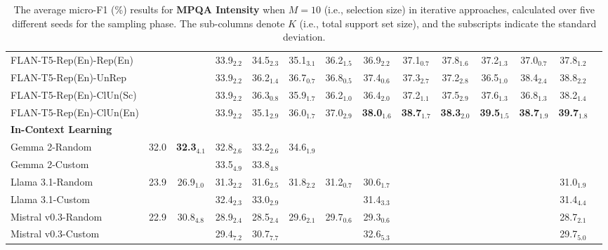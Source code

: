 \documentclass[11pt]{article}
\theoremstyle{definition}
\begin{document}
\begin{table*}[hbt]
{\begin{tabular}{l|ccccccccccccc}
FLAN-T5-Rep(En)-Rep(En) &
& & 33.9$_{2.2}$ & 34.5$_{2.3}$ & 35.1$_{3.1}$ & 36.2$_{1.5}$ & 36.9$_{2.2}$ & 37.1$_{0.7}$ & 37.8$_{1.6}$ & 37.2$_{1.3}$ & 37.0$_{0.7}$ & 37.8$_{1.2}$ & \\

FLAN-T5-Rep(En)-UnRep &
& & 33.9$_{2.2}$ & 36.2$_{1.4}$ & 36.7$_{0.7}$ & 36.8$_{0.5}$ & 37.4$_{0.6}$ & 37.3$_{2.7}$ & 37.2$_{2.8}$ & 36.5$_{1.0}$ & 38.4$_{2.4}$ & 38.8$_{2.2}$ & \\

FLAN-T5-Rep(En)-ClUn(Sc) &
& & 33.9$_{2.2}$ & 36.3$_{0.8}$ & 35.9$_{1.7}$ & 36.2$_{1.0}$ & 36.4$_{2.0}$ & 37.2$_{1.1}$ & 37.5$_{2.9}$ & 37.6$_{1.3}$ & 36.8$_{1.3}$ & 38.2$_{1.4}$ & \\

FLAN-T5-Rep(En)-ClUn(En) &
& & 33.9$_{2.2}$ & 35.1$_{2.9}$ & 36.0$_{1.7}$ & 37.0$_{2.9}$ & \textbf{38.0}$_{1.6}$ & \textbf{38.7}$_{1.7}$ & \textbf{38.3}$_{2.0}$ & \textbf{39.5}$_{1.5}$ & \textbf{38.7}$_{1.9}$ & \textbf{39.7}$_{1.8}$ & \\

\hdashline

\textbf{In-Context Learning} \\

Gemma 2-Random &
32.0 & \textbf{32.3}$_{4.1}$ & 32.8$_{2.6}$ & 33.2$_{2.6}$ & 34.6$_{1.9}$ & & & \\

Gemma 2-Custom &
& & 33.5$_{4.9}$ & 33.8$_{4.8}$ & & & \\

\hdashline[1pt/4pt]

Llama 3.1-Random &
23.9 & 26.9$_{1.0}$ & 31.3$_{2.2}$ & 31.6$_{2.5}$ & 31.8$_{2.2}$ & 31.2$_{0.7}$ & 30.6$_{1.7}$ & & & & & 31.0$_{1.9}$ \\

Llama 3.1-Custom &
& & 32.4$_{2.3}$ & 33.0$_{2.9}$ & & & 31.4$_{3.3}$ & & & & & 31.4$_{4.4}$ & \\

\hdashline[1pt/4pt]

Mistral v0.3-Random &
22.9 & 30.8$_{4.8}$ & 28.9$_{2.4}$ & 28.5$_{2.4}$ & 29.6$_{2.1}$ & 29.7$_{0.6}$ & 29.3$_{0.6}$ & & & & & 28.7$_{2.1}$ \\

Mistral v0.3-Custom &
& & 29.4$_{7.2}$ & 30.7$_{7.7}$ & & & 32.6$_{5.3}$ & & & & & 29.7$_{5.0}$ & \\

\hline

\end{tabular}
}
\caption{The average micro-F1 (\%) results for {\bf MPQA Intensity} when $M=10$ (i.e., selection size) in iterative approaches, calculated over five different seeds for the sampling phase. The sub-columns denote $K$ (i.e., total support set size), and the subscripts indicate the standard deviation.}
\label{table:i-complete}
\end{table*}
\end{document}
